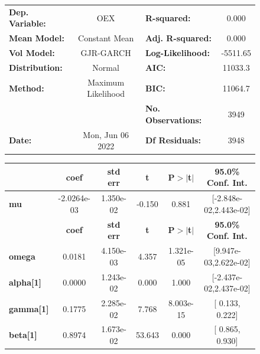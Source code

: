 \documentclass[a4paper, oneside]{discothesis}
\begin{document}
\begin{figure}
\begin{multicols}{2}
{  
\begin{center}
\begin{tabular}{lclc}
\toprule
\textbf{Dep. Variable:} &         OEX        & \textbf{  R-squared:         } &     0.000   \\
\textbf{Mean Model:}    &   Constant Mean    & \textbf{  Adj. R-squared:    } &     0.000   \\
\textbf{Vol Model:}     &     GJR-GARCH      & \textbf{  Log-Likelihood:    } &   -5511.65  \\
\textbf{Distribution:}  &       Normal       & \textbf{  AIC:               } &    11033.3  \\
\textbf{Method:}        & Maximum Likelihood & \textbf{  BIC:               } &    11064.7  \\
\textbf{}               &                    & \textbf{  No. Observations:  } &    3949     \\
\textbf{Date:}          &  Mon, Jun 06 2022  & \textbf{  Df Residuals:      } &    3948     \\
\bottomrule
\end{tabular}
\begin{tabular}{lccccc}
            & \textbf{coef} & \textbf{std err} & \textbf{t} & \textbf{P$> |$t$|$} & \textbf{95.0\% Conf. Int.}  \\
\midrule
\textbf{mu} &  -2.0264e-03  &    1.350e-02     &    -0.150  &          0.881       &   [-2.848e-02,2.443e-02]    \\
                  & \textbf{coef} & \textbf{std err} & \textbf{t} & \textbf{P$> |$t$|$} & \textbf{95.0\% Conf. Int.}  \\
\midrule
\textbf{omega}    &       0.0181  &    4.150e-03     &     4.357  &      1.321e-05       &   [9.947e-03,2.622e-02]     \\
\textbf{alpha[1]} &     0.0000    &    1.243e-02     &   0.000    &          1.000       &   [-2.437e-02,2.437e-02]    \\
\textbf{gamma[1]} &       0.1775  &    2.285e-02     &     7.768  &      8.003e-15       &     [  0.133,  0.222]       \\
\textbf{beta[1]}  &       0.8974  &    1.673e-02     &    53.643  &        0.000         &     [  0.865,  0.930]       \\
\bottomrule
\end{tabular}
\end{center}

}
\end{multicols}
\end{figure}
\end{document}
